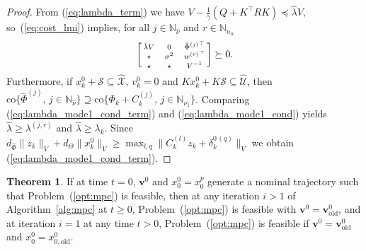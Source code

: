 \documentclass{IEEEtran}
\theoremstyle{definition}
\newtheorem{theorem}{Theorem}
\theoremstyle{remark}
\begin{document}
\begin{proof}
From (\ref{eq:lambda_term}) we have
$V - \frac{1}{\gamma}(Q+K^\top R K) \preceq \hat{\lambda}V$,
%
so~(\ref{eq:cost_lmi}) implies, for all $j\in \mathbb{N}_{\hat{\nu}}$ and $r \in \mathbb{N}_{n_w}$%
\def\strut{\rule{0pt}{8pt}}%
\begin{equation}\label{eq:lambda_mode1_cond_term}
\biggl[\begin{smallmatrix}
\hat{\lambda} V & ~~~0~~~ & \hat{\Phi}{\mbox{}^{(j)}}^\top
\\
\star\strut & \sigma^2 & {w^{(r)}}^\top
\\
\star\strut & \star & V^{-1}
\end{smallmatrix}\biggr] \succeq 0 .
\end{equation}
Furthermore, if $x^0_k + \mathcal{S} \subseteq \hat{\mathcal{X}}$, $v^0_k=0$ and ${Kx^0_k + K\mathcal{S}\subseteq \hat{\mathcal{U}}}$, then
$\mathrm{co}\{ \hat{\Phi}^{(j)}, \, j \in \mathbb{N}_{\hat{\nu}} \} \supseteq \mathrm{co}\{ \Phi_k + C_k^{(j)}, \, j\in\mathbb{N}_{\nu_1} \}$. Comparing  
(\ref{eq:lambda_mode1_cond_term}) and (\ref{eq:lambda_mode1_cond}) yields
$\hat{\lambda} \geq \lambda^{(j,r)}$ and 
$\hat{\lambda} \geq \lambda_k$. Since $d_{\hat{\Phi}} \|z_k\|_V + d_\Theta \|x^0_k\|_V \geq \max_{l, q} \lVert C^{(l)}_k z_k + \delta^{0\,(q)}_k \rVert_V$ we obtain (\ref{eq:lambda_mode1_cond_term}).
\end{proof}


\begin{theorem}\label{thm:feasibility}
If at time $t=0$, $\mathbf{v}^0$ and $x^0_0=x^p_0$ generate a nominal trajectory such that Problem~(\ref{opt:mpc}) is feasible, then 
%
at any iteration $i>1$ of Algorithm~\ref{alg:mpc} at $t\geq 0$, Problem~(\ref{opt:mpc}) is feasible with
$\mathbf{v}^0 = \mathbf{v}^0_{\mathrm{old}}$,
%
and at iteration $i=1$ at any time $t>0$, Problem~(\ref{opt:mpc}) is feasible if  $\mathbf{v}^0 = \mathbf{v}^0_{\mathrm{old}}$ and $x^0_0 = x^0_{0,\mathrm{old}}$.
\end{theorem}
\end{document}
